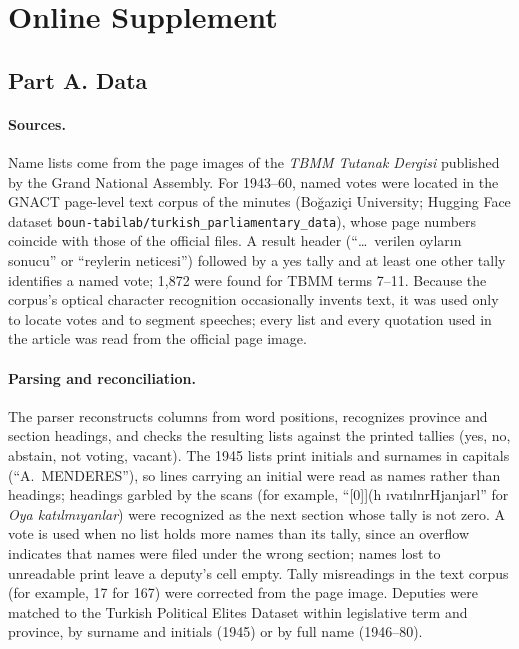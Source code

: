 \setcounter{table}{0}
\setcounter{figure}{0}
\renewcommand{\thetable}{A\arabic{table}}
\renewcommand{\thefigure}{A\arabic{figure}}

\section*{Online Supplement}

\subsection*{Part A. Data}

\paragraph{Sources.} Name lists come from the page images of the \textit{TBMM Tutanak Dergisi} published by the Grand National Assembly. For 1943--60, named votes were located in the GNACT page-level text corpus of the minutes (Bo\u{g}azi\c{c}i University; Hugging Face dataset \texttt{boun-tabilab/turkish\_parliamentary\_data}), whose page numbers coincide with those of the official files. A result header (``\ldots\ verilen oyların sonucu'' or ``reylerin neticesi'') followed by a yes tally and at least one other tally identifies a named vote; 1,872 were found for TBMM terms 7--11. Because the corpus's optical character recognition occasionally invents text, it was used only to locate votes and to segment speeches; every list and every quotation used in the article was read from the official page image.

\paragraph{Parsing and reconciliation.} The parser reconstructs columns from word positions, recognizes province and section headings, and checks the resulting lists against the printed tallies (yes, no, abstain, not voting, vacant). The 1945 lists print initials and surnames in capitals (``A.~MENDERES''), so lines carrying an initial were read as names rather than headings; headings garbled by the scans (for example, ``[0]](h ıvatılnrHjanjarl'' for \textit{Oya katılmıyanlar}) were recognized as the next section whose tally is not zero. A vote is used when no list holds more names than its tally, since an overflow indicates that names were filed under the wrong section; names lost to unreadable print leave a deputy's cell empty. Tally misreadings in the text corpus (for example, 17 for 167) were corrected from the page image. Deputies were matched to the Turkish Political Elites Dataset within legislative term and province, by surname and initials (1945) or by full name (1946--80).

